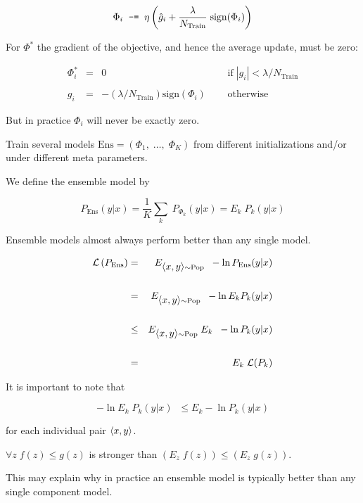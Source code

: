 {

$$\Phi_i \;\;  \mbox{\tt -=} \;\;  \eta \left(\hat{g}_i + \frac{\lambda}{N_{\mathrm{Train}}}\;\mathrm{sign}(\Phi_i)\right)$$
\vfill

\vfill
For $\Phi^*$ the gradient of the objective, and hence the average update, must be zero:

\vfill
$$\begin{array}{rcll}
\Phi^*_i &  = & 0  & \;\;\;\;\;\mbox{if} \;|g_i| <  \lambda/N_{\mathrm{Train}} \\
\\
g_i & = &  -(\lambda/N_{\mathrm{Train}}) \mathrm{sign}(\Phi_i) &\;\;\;\;\; \mbox{otherwise}
\end{array}$$

\vfill
But in practice $\Phi_i$ will never be exactly zero.


Train several models $\mathrm{Ens} = (\Phi_1,\;\ldots,\; \Phi_K)$ from different initializations and/or under different meta parameters.

\vfill
We define the ensemble model by

$$P_\mathrm{Ens}(y|x) = \frac{1}{K} \sum_k\; P_{\Phi_k}(y|x) = E_k \;P_k(y|x)$$

\vfill
Ensemble models almost always perform better than any single model.


\vfill
{}

\begin{eqnarray*}
{\cal L}\left(P_\mathrm{Ens}\right) & = & E_{{\mbox{$\langle x,y\rangle$}} \sim \mathrm{Pop}}\;\;-\ln P_\mathrm{Ens}(y|x) \\
\\
 & = & E_{{\mbox{$\langle x,y\rangle$}} \sim \mathrm{Pop}}\;\;-\ln E_k P_k(y|x) \\
\\
& \leq & E_{{\mbox{$\langle x,y\rangle$}} \sim \mathrm{Pop}} \;E_k\;\;-\ln P_k(y|x) \\
\\
& = & E_k\; {\cal L}(P_k)
\end{eqnarray*}


It is important to note that

$$-\ln E_k \;P_k(y|x) \;\;\leq E_k -\ln P_k(y|x)$$

\vfill
for each individual pair ${\mbox{$\langle x,y\rangle$}}$.

\vfill
$\forall z\; f(z) \leq g(z)$ is stronger than $(E_z\;f(z)) \leq (E_z\; g(z))$.

\vfill
This may explain why in practice an ensemble model is typically better than any single component model.


}

